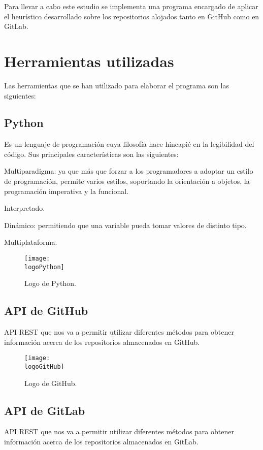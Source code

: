 Para llevar a cabo este estudio se implementa una programa encargado de aplicar el heurístico desarrollado sobre los repositorios alojados tanto en GitHub como en GitLab.

\section{Herramientas utilizadas}
Las herramientas que se han utilizado para elaborar el programa son las siguientes:
\subsection{Python}
Es un lenguaje de programación cuya filosofía hace hincapié en la legibilidad del código. Sus principales características son las siguientes:
\begin{compactitem}
    \item Multiparadigma: ya que más que forzar a los programadores a adoptar un estilo de programación, permite varios estilos, soportando la orientación a objetos, la programación imperativa y la funcional.
    \item Interpretado.
    \item Dinámico: permitiendo que una variable pueda tomar valores de distinto tipo.
    \item Multiplataforma.
\end{compactitem}

\begin{figure}[h]
    \centering
    \texttt{[image: \\logoPython]}
    \caption{Logo de Python.}
\end{figure}

\subsection{API de GitHub}
API REST que nos va a permitir utilizar diferentes métodos para obtener información acerca de los repositorios almacenados en GitHub.

\begin{figure}[h]
    \centering
    \texttt{[image: \\logoGitHub]}
    \caption{Logo de GitHub.}
\end{figure}

\subsection{API de GitLab}
API REST que nos va a permitir utilizar diferentes métodos para obtener información acerca de los repositorios almacenados en GitLab.

